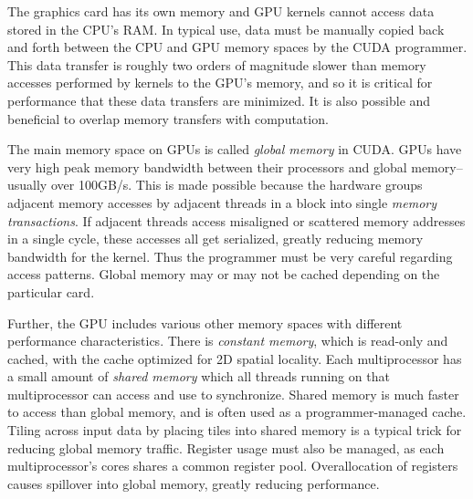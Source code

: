 \documentclass[preprint]{sigplanconf}
\begin{document}
The graphics card has its own memory and GPU kernels cannot access data stored
in the CPU's RAM.  In typical use, data must be manually copied back and forth
between the CPU and GPU memory spaces by the CUDA programmer.  This data
transfer is roughly two orders of magnitude slower than memory accesses
performed by kernels to the GPU's memory, and so it is critical for performance
that these data transfers are minimized.  It is also possible and beneficial to
overlap memory transfers with computation.

The main memory space on GPUs is called \emph{global memory} in CUDA.  GPUs have
very high peak memory bandwidth between their processors and global
memory--usually over 100GB/s. This is made possible because the hardware groups
adjacent memory accesses by adjacent threads in a block into single \emph{memory
transactions}. If adjacent threads access misaligned or scattered memory
addresses in a single cycle, these accesses all get serialized, greatly reducing
memory bandwidth for the kernel. Thus the programmer must be very careful
regarding access patterns.  Global memory may or may not be cached depending on
the particular card.

Further, the GPU includes various other memory spaces with different
performance characteristics.  There is \emph{constant memory}, which is
read-only and cached, with the cache optimized for 2D spatial locality.  Each
multiprocessor has a small amount of \emph{shared memory} which all threads
running on that multiprocessor can access and use to synchronize.  Shared
memory is much faster to access than global memory, and is often used as a
programmer-managed cache.  Tiling across input data by placing tiles into
shared memory is a typical trick for reducing global memory traffic.  Register
usage must also be managed, as each multiprocessor's cores shares a common
register pool.  Overallocation of registers causes spillover into global
memory, greatly reducing performance.

%
\end{document}
